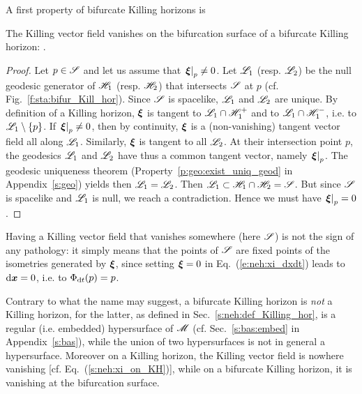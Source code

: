 A first property of bifurcate Killing horizons is
\begin{prop}
\label{p:sta:xi_S_zero}
The Killing vector field vanishes on the bifurcation surface of
a bifurcate Killing horizon:
\be \label{e:sta:xi_S_zero}
     .
\ee
\end{prop}
\begin{proof}
Let $p\in \mathscr{S}$ and let us assume that $\left.\bm{\xi}\right| _p\not=0$.
Let $\mathscr{L}_1$ (resp. $\mathscr{L}_2$) be the null geodesic generator of $\mathscr{H}_1$
(resp. $\mathscr{H}_2$) that intersects $\mathscr{S}$ at $p$ (cf. Fig.~\ref{f:sta:bifur_Kill_hor}).
Since $\mathscr{S}$ is spacelike,
$\mathscr{L}_1$ and $\mathscr{L}_2$ are unique. By definition of a Killing horizon,
$\bm{\xi}$ is tangent to $\mathscr{L}_1\cap\mathscr{H}_1^+$ and to $\mathscr{L}_1\cap\mathscr{H}_1^-$,
i.e. to $\mathscr{L}_1\setminus\{p\}$.
If $\left.\bm{\xi}\right| _p \not=0$, then by continuity,
$\bm{\xi}$ is a (non-vanishing) tangent vector field all along $\mathscr{L}_1$.
Similarly, $\bm{\xi}$ is tangent to all $\mathscr{L}_2$.
At their intersection point $p$, the geodesics $\mathscr{L}_1$ and $\mathscr{L}_2$ have thus a common tangent
vector, namely $\left.\bm{\xi}\right| _p$.
The geodesic uniqueness theorem (Property~\ref{p:geo:exist_uniq_geod} in Appendix~\ref{s:geo})
yields then $\mathscr{L}_1 = \mathscr{L}_2$.
Then $\mathscr{L}_1 \subset \mathscr{H}_1 \cap \mathscr{H}_2 = \mathscr{S}$. But since $\mathscr{S}$ is spacelike and
$\mathscr{L}_1$ is null, we reach a contradiction. Hence we must have
$\left.\bm{\xi}\right| _p = 0$.
\end{proof}

\begin{remark}
\label{r:sta:zero_Killing}
Having a Killing vector field that vanishes somewhere (here $\mathscr{S}$) is not the sign
of any pathology: it simply means that the points of $\mathscr{S}$ are fixed points of
the isometries generated by $\bm{\xi}$, since
setting $\bm{\xi}=0$ in Eq.~(\ref{e:neh:xi_dxdt}) leads to $\mathrm{d}\bm{x}=0$, i.e.
to $\Phi_{\mathrm{d} t}(p) = p$.
\end{remark}

\begin{remark}
Contrary to what the name may suggest, a bifurcate Killing horizon is \emph{not}
a Killing horizon, for the latter, as defined in Sec.~\ref{s:neh:def_Killing_hor},
is a regular (i.e. embedded) hypersurface
of $\mathscr{M}$ (cf. Sec.~\ref{s:bas:embed} in Appendix~\ref{s:bas}), while
the union of two hypersurfaces is not in general a hypersurface. Moreover
on a Killing horizon, the Killing vector field is nowhere vanishing
[cf. Eq.~(\ref{s:neh:xi_on_KH})], while on
a bifurcate Killing horizon, it is vanishing at the bifurcation surface.
\end{remark}

